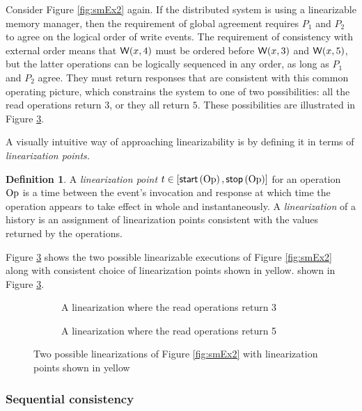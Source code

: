 \documentclass[]             %
{NASA}                       %
\theoremstyle{definition}
\newtheorem{definition}[theorem]{Definition}
\begin{document}
Consider Figure \ref{fig:smEx2} again. If the distributed system is
using a linearizable memory manager, then the requirement of global
agreement requires $P_1$ and $P_2$ to agree on the logical order of
write events. The requirement of consistency with external order means
that $\mathsf{W}\!\left(x, 4\right)$ must be ordered before $\mathsf{W}\!\left(x, 3\right)$ and
$\mathsf{W}\!\left(x, 5\right)$, but the latter operations can be logically
sequenced in any order, as long as $P_1$ and $P_2$ agree. They must
return responses that are consistent with this common operating
picture, which constrains the system to one of two possibilities: all
the read operations return $3$, or they all return $5$. These
possibilities are illustrated in Figure \ref{fig:smEx3}.

A visually intuitive way of approaching linearizability is by defining
it in terms of \emph{linearization points.}

\begin{definition}
  A \emph{linearization point} $t \in [\mathsf{start}\left(\mathrm{Op}\right), \mathsf{stop}\left(\mathrm{Op}\right)]$
  for an operation $\mathrm{Op}$ is a time between the event's invocation and
  response at which time the operation appears to take effect in whole
  and instantaneously. A \emph{linearization} of a history is an
  assignment of linearization points consistent with the values
  returned by the operations.
\end{definition}

Figure \ref{fig:smEx3} shows the two possible linearizable executions
of Figure \ref{fig:smEx2} along with consistent choice of
linearization points shown in yellow.  shown in Figure
\ref{fig:smEx3}.

\begin{figure}
  \begin{subfigure}{1\textwidth}
    \centering
    
    \caption{A linearization where the read operations return 3}
    \label{fig:smEx3-a}
  \end{subfigure}
  \begin{subfigure}{1\textwidth}
    
        \caption{A linearization where the read operations return 5}
    \label{fig:smEx3-b}
  \end{subfigure}
  \caption{Two possible linearizations of Figure \ref{fig:smEx2} with linearization points shown in yellow}
  \label{fig:smEx3}
\end{figure}

\subsubsection{Sequential consistency}
\label{sequential-consistency}
\end{document}

